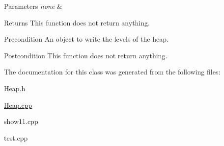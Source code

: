 \begin{DoxyParams}{Parameters}
{\em none} & \\
\hline
\end{DoxyParams}
\begin{DoxyReturn}{Returns}
This function does not return anything.
\end{DoxyReturn}
\begin{DoxyPrecond}{Precondition}
An object to write the levels of the heap. 
\end{DoxyPrecond}
\begin{DoxyPostcond}{Postcondition}
This function does not return anything. 
\end{DoxyPostcond}


The documentation for this class was generated from the following files\+:\begin{DoxyCompactItemize}
\item 
Heap.\+h\item 
\hyperlink{_heap_8cpp}{Heap.\+cpp}\item 
show11.\+cpp\item 
test.\+cpp\end{DoxyCompactItemize}
